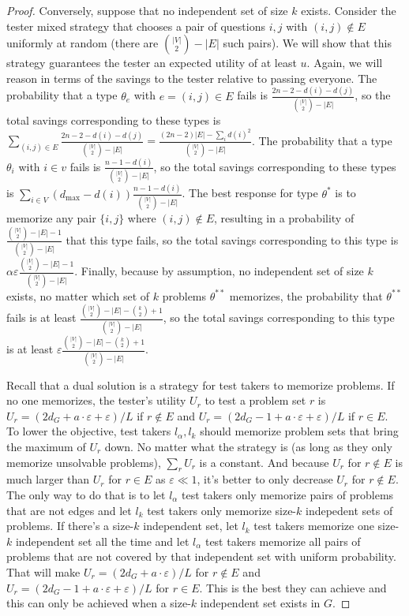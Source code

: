 \documentclass{article}
\begin{document}
\begin{proof}
Conversely, suppose that no independent set of size $k$ exists.  Consider
the tester mixed strategy that chooses a pair of questions $i,j$ with
$(i,j) \notin E$ uniformly at random (there are ${|V| \choose 2} - |E|$
such pairs).  We will show that this strategy guarantees the tester an
expected utility of at least $u$.  Again, we will reason in terms of the
savings to the tester relative to passing everyone.  The probability that a
type $\theta_e$ with $e = (i,j) \in E$ fails is $\frac{2n-2-d(i)-d(j)}{{|V|
    \choose 2} - |E|}$, so the total savings corresponding to these types
is $\sum_{(i,j) \in E} \frac{2n-2-d(i)-d(j)}{{|V| \choose 2} - |E|} = \frac
{(2n-2)|E| - \sum_i d(i)^2}{{|V| \choose 2} - |E|}$.  The probability that
a type $\theta_i$ with $i \in v$ fails is $\frac{n-1 - d(i)}{{|V| \choose
    2} - |E|}$, so the total savings corresponding to these types
is  $\sum_{i \in V} (d_{\text{max}}-d(i)) \frac{n-1 - d(i)}{{|V| \choose
    2} - |E|}$. 
The best response for type $\theta^*$ is to memorize any pair $\{i,j\}$
where $(i,j) \notin E$, 
resulting in a probability of $\frac{{|V| \choose 2} - |E| - 1}
{{|V| \choose 2} - |E|}$ that this type fails, so the total savings
corresponding to this type is $\alpha \varepsilon 
\frac{{|V| \choose 2} - |E| - 1}
{{|V| \choose 2} - |E|}$.
Finally, because by assumption, no independent set of size $k$ exists, no
matter which set of $k$ problems $\theta^{**}$ memorizes,
the probability that 
 $\theta^{**}$ fails is at least $\frac{{|V| \choose 2} - |E| - {k \choose 2} +1}{
{|V| \choose 2} - |E|}$, so the total savings
corresponding to this type is at least $\varepsilon \frac{{|V| \choose 2} - |E| - {k \choose 2} +1}{
{|V| \choose 2} - |E|}$.



Recall that a dual solution is a strategy for test takers to memorize
problems. If no one memorizes, the tester's utility $U_r$ to test a problem set
$r$ is $U_r = (2d_G+a\cdot\varepsilon + \varepsilon) /L$ if $r \notin E$ and
$U_r = (2d_G-1+a\cdot\varepsilon + \varepsilon)/L$ if $r \in E$. To lower the
objective, test takers $l_\alpha, l_k$ should memorize problem sets that bring
the maximum of $U_r$ down.  No matter what the strategy is (as long as they
only memorize unsolvable problems), $\sum_r U_r$ is a constant. And because
$U_r$ for $r \notin E$ is much larger than $U_r$ for $r \in E$ as $\varepsilon
\ll 1$, it's better to only decrease $U_r$ for $r \notin E$. The only way to do
that is to let $l_\alpha$ test takers only memorize pairs of problems that are
not edges and let $l_k$ test takers only memorize size-$k$ indepedent sets of
problems.  If there's a size-$k$ independent set, let $l_k$ test takers
memorize one size-$k$ independent set all the time and let $l_\alpha$ test
takers memorize all pairs of problems that are not covered by that independent
set with uniform probability. That will make $U_r = (2d_G+a\cdot\varepsilon)/L$
for $r \notin E$ and $U_r = (2d_G-1+a\cdot\varepsilon+\varepsilon)/L$ for $r
\in E$.  This is the best they can achieve and this can only be achieved when a
size-$k$ independent set exists in $G$.

\end{proof}
\end{document}
